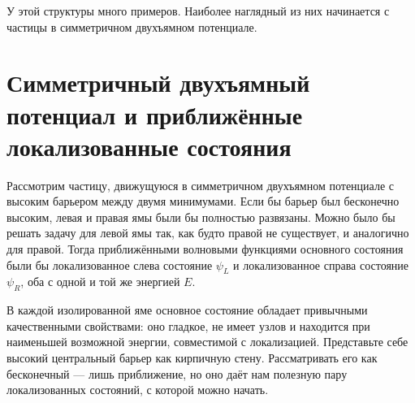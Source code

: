 У этой структуры много примеров. Наиболее наглядный из них начинается с частицы в симметричном двухъямном потенциале.

\section{Симметричный двухъямный потенциал и приближённые локализованные состояния}

Рассмотрим частицу, движущуюся в симметричном двухъямном потенциале с высоким барьером между двумя минимумами. Если бы барьер был бесконечно высоким, левая и правая ямы были бы полностью развязаны. Можно было бы решать задачу для левой ямы так, как будто правой не существует, и аналогично для правой. Тогда приближёнными волновыми функциями основного состояния были бы локализованное слева состояние \(\psi_L\) и локализованное справа состояние \(\psi_R\), оба с одной и той же энергией \(E\).

В каждой изолированной яме основное состояние обладает привычными качественными свойствами: оно гладкое, не имеет узлов и находится при наименьшей возможной энергии, совместимой с локализацией. Представьте себе высокий центральный барьер как кирпичную стену. Рассматривать его как бесконечный — лишь приближение, но оно даёт нам полезную пару локализованных состояний, с которой можно начать.

